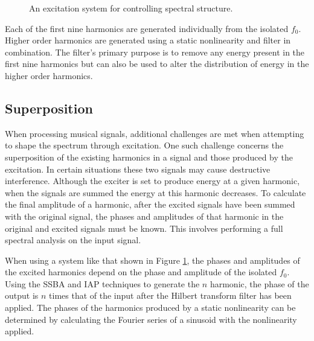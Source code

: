 \begin{figure}[h!]
			\caption{An excitation system for controlling spectral structure.}
			\label{fig:SpectralShapingSystem}
		\end{figure}

		Each of the first nine harmonics are generated individually from the isolated $f_{0}$. Higher order
		harmonics are generated using a static nonlinearity and filter in combination. The filter's primary purpose
		is to remove any energy present in the first nine harmonics but can also be used to alter the distribution
		of energy in the higher order harmonics.

	\subsection{Superposition}
	\label{sec:FeatureControl-Systems-Superposition}
		When processing musical signals, additional challenges are met when attempting to shape the spectrum
		through excitation. One such challenge concerns the superposition of the existing harmonics in a signal and
		those produced by the excitation. In certain situations these two signals may cause destructive
		interference. Although the exciter is set to produce energy at a given harmonic, when the signals are
		summed the energy at this harmonic decreases. To calculate the final amplitude of a harmonic, after the
		excited signals have been summed with the original signal, the phases and amplitudes of that harmonic in
		the original and excited signals must be known. This involves performing a full spectral analysis on the
		input signal. 

		When using a system like that shown in Figure \ref{fig:SpectralShapingSystem}, the phases and amplitudes of
		the excited harmonics depend on the phase and amplitude of the isolated $f_{0}$. Using the SSBA and IAP
		techniques to generate the $n$ harmonic, the phase of the output is $n$ times that of the input
		after the Hilbert transform filter has been applied. The phases of the harmonics produced by a static
		nonlinearity can be determined by calculating the Fourier series of a sinusoid with the nonlinearity
		applied.

